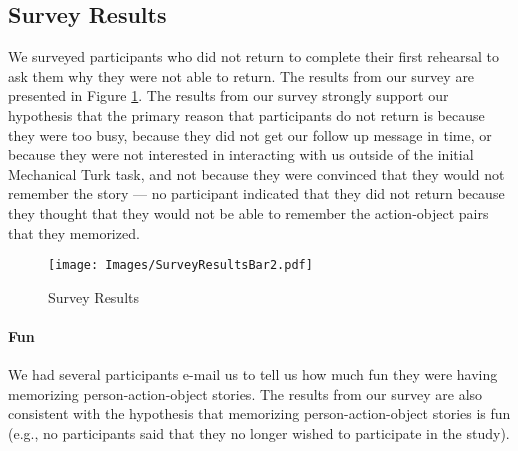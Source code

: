 \subsection{Survey Results} \label{subsubsec:SurveyResults} We surveyed  participants who did not return to complete their first rehearsal to ask them why they were not able to return. The results from our survey are presented in Figure \ref{fig:SurveyReturned}. The results from our survey strongly support our hypothesis that the primary reason that participants do not return is because they were too busy, because they did not get our follow up message in time, or because they were not interested in interacting with us outside of the initial Mechanical Turk task, and not because they were convinced that they would not remember the story --- no participant indicated that they did not return because they thought that they would not be able to remember the action-object pairs that they memorized.

\begin{figure}[htb]
\begin{center}
\hspace*{-0.1\columnwidth}
\texttt{[image: Images/SurveyResultsBar2.pdf]}
\end{center}
\caption[Survey: Which of the following reasons best describes why you were unable to return to take the follow up test?]{Survey Results}
\label{fig:SurveyReturned}
\end{figure}

\paragraph*{Fun} We had several participants e-mail us to tell us how much fun they were having memorizing person-action-object stories. The results from our survey are also consistent with the hypothesis that memorizing person-action-object stories is fun (e.g., no participants said that they no longer wished to participate in the study). 

